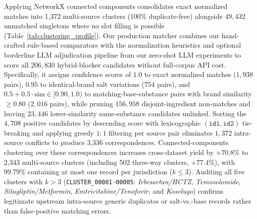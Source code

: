 \documentclass{llncs}
\begin{document}
Applying NetworkX connected components consolidates exact normalized matches into 1,372 multi-source clusters ($100\%$ duplicate-free) alongside $49{,}432$ unmatched singletons where no slot filling is possible (Table~\ref{tab:clustering_profile}). Our production matcher combines our hand-crafted rule-based comparators with the normalization heuristics and optional borderline LLM adjudication pipeline from our zero-shot LLM experiments to score all $206{,}830$ hybrid-blocker candidates without full-corpus API cost. Specifically, it assigns confidence scores of $1.0$ to exact normalized matches ($1{,}938$ pairs), $0.95$ to identical-brand salt variations ($754$ pairs), and $0.5 + 0.5 \cdot \text{sim} \in [0.90, 1.0)$ to matching-base-substance pairs with brand similarity $\ge 0.80$ ($2{,}016$ pairs), while pruning $156{,}958$ disjoint-ingredient non-matches and leaving $23{,}446$ lower-similarity same-substance candidates unlinked. Sorting the $4{,}708$ positive candidates by descending score with lexicographic $(\texttt{id1}, \texttt{id2})$ tie-breaking and applying greedy $1{:}1$ filtering per source pair eliminates $1{,}372$ intra-source conflicts to produce 3,336 correspondences. Connected-components clustering over these correspondences increases cross-dataset yield by $+70.8\%$ to 2,343 multi-source clusters (including 502 three-way clusters, $+77.4\%$), with $99.79\%$ containing at most one record per jurisdiction ($k \le 3$). Auditing all five clusters with $k > 3$ (\texttt{CLUSTER\_00001}--\texttt{00005}: \textit{Irbesartan/HCTZ}, \textit{Temozolomide}, \textit{Sitagliptin/Metformin}, \textit{Emtricitabine/Tenofovir}, and \textit{Koselugo}) confirms legitimate upstream intra-source generic duplicates or salt-vs.-base records rather than false-positive matching errors.
\end{document}
